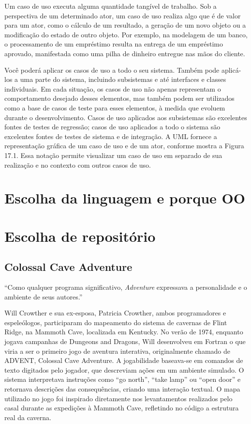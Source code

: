 \documentclass[12pt,a4paper]{article}
\begin{document}
Um caso de uso executa alguma quantidade tangível de trabalho. Sob a
perspectiva de um determinado ator, um caso de uso realiza algo que é de valor
para um ator, como o cálculo de um resultado, a geração de um novo objeto ou
a modificação do estado de outro objeto. Por exemplo, na modelagem de um
banco, o processamento de um empréstimo resulta na entrega de um empréstimo aprovado, manifestada como uma pilha de dinheiro entregue nas mãos do
cliente.

Você poderá aplicar os casos de uso a todo o seu sistema. Também pode
aplicá-los a uma parte do sistema, incluindo subsistemas e até interfaces e classes
individuais. Em cada situação, os casos de uso não apenas representam o comportamento desejado desses elementos, mas também podem ser utilizados como
a base de casos de teste para esses elementos, à medida que evoluem durante o
desenvolvimento. Casos de uso aplicados aos subsistemas são excelentes fontes
de testes de regressão; casos de uso aplicados a todo o sistema são excelentes
fontes de testes de sistema e de integração. A UML fornece a representação gráfica de um caso de uso e de um ator, conforme mostra a Figura 17.1. Essa notação permite visualizar um caso de uso em separado de sua realização e no contexto com outros casos de uso.
\section{Escolha da linguagem e porque OO}
\section{Escolha de repositório}
\subsection{Colossal Cave Adventure}
“Como qualquer programa significativo, \textit{Adventure} expressava a personalidade e o ambiente de seus autores.” \textcite{levy2010hackers}

Will Crowther e sua ex-esposa, Patricia Crowther, ambos programadores e espeleólogos, participaram do mapeamento do sistema de cavernas de Flint Ridge, na Mammoth Cave, localizada em Kentucky. No verão de 1974, enquanto jogava campanhas de Dungeons and Dragons, Will desenvolveu em Fortran o que viria a ser o primeiro jogo de aventura interativa, originalmente chamado de ADVENT, Colossal Cave Adventure. A jogabilidade baseava-se em comandos de texto digitados pelo jogador, que descreviam ações em um ambiente simulado. O sistema interpretava instruções como “go north”, “take lamp” ou “open door” e retornava descrições das consequências, criando uma interação textual. O mapa utilizado no jogo foi inspirado diretamente nos levantamentos realizados pelo casal durante as expedições à Mammoth Cave, refletindo no código a estrutura real da caverna.
\end{document}

